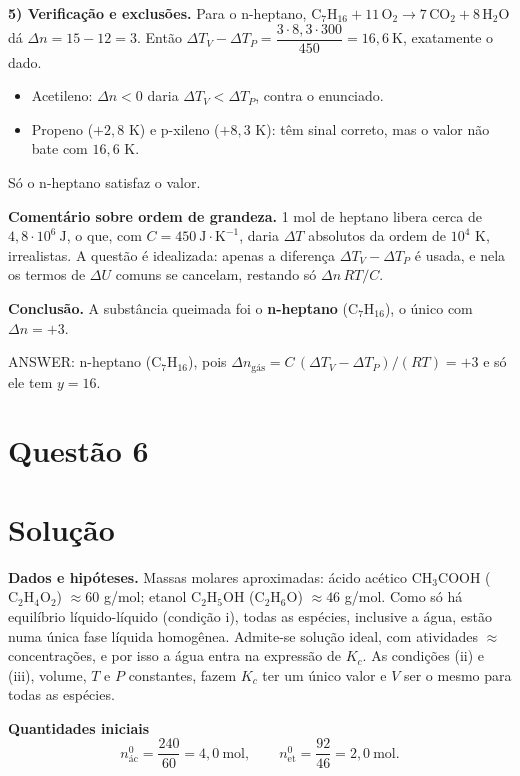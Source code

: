 \documentclass{article}%
\begin{document}
\textbf{5) Verificação e exclusões.}
Para o n-heptano, $\text{C}_7\text{H}_{16}+11\,\text{O}_2\to 7\,\text{CO}_2+8\,\text{H}_2\text{O}$ dá $\Delta n=15-12=3$. Então $\Delta T_V-\Delta T_P=\dfrac{3\cdot 8{,}3\cdot 300}{450}=16{,}6\ \text{K}$, exatamente o dado.
\begin{itemize}
\item Acetileno: $\Delta n<0$ daria $\Delta T_V<\Delta T_P$, contra o enunciado.
\item Propeno ($+2{,}8$ K) e p-xileno ($+8{,}3$ K): têm sinal correto, mas o valor não bate com $16{,}6$ K.
\end{itemize}
Só o n-heptano satisfaz o valor.

\textbf{Comentário sobre ordem de grandeza.} 1 mol de heptano libera cerca de $4{,}8\cdot 10^{6}\ \text{J}$, o que, com $C=450\ \text{J}\cdot\text{K}^{-1}$, daria $\Delta T$ absolutos da ordem de $10^{4}$ K, irrealistas. A questão é idealizada: apenas a diferença $\Delta T_V-\Delta T_P$ é usada, e nela os termos de $\Delta U$ comuns se cancelam, restando só $\Delta n\,RT/C$.

\textbf{Conclusão.} A substância queimada foi o \textbf{n-heptano} ($\text{C}_7\text{H}_{16}$), o único com $\Delta n=+3$.

ANSWER: n-heptano ($\text{C}_7\text{H}_{16}$), pois $\Delta n_{\text{gás}}=C\,(\Delta T_V-\Delta T_P)/(RT)=+3$ e só ele tem $y=16$.%
\newpage%
\section*{Questão 6}

\section*{Solução}

\textbf{Dados e hipóteses.} Massas molares aproximadas: ácido acético $\mathrm{CH_3COOH}$ ($\mathrm{C_2H_4O_2}$) $\approx 60$ g/mol; etanol $\mathrm{C_2H_5OH}$ ($\mathrm{C_2H_6O}$) $\approx 46$ g/mol. Como só há equilíbrio líquido-líquido (condição i), todas as espécies, inclusive a água, estão numa única fase líquida homogênea. Admite-se solução ideal, com atividades $\approx$ concentrações, e por isso a água entra na expressão de $K_c$. As condições (ii) e (iii), volume, $T$ e $P$ constantes, fazem $K_c$ ter um único valor e $V$ ser o mesmo para todas as espécies.

\textbf{Quantidades iniciais}
\[
n_{\text{ác}}^{0}=\frac{240}{60}=4{,}0\ \text{mol},\qquad n_{\text{et}}^{0}=\frac{92}{46}=2{,}0\ \text{mol}.
\]
\end{document}

